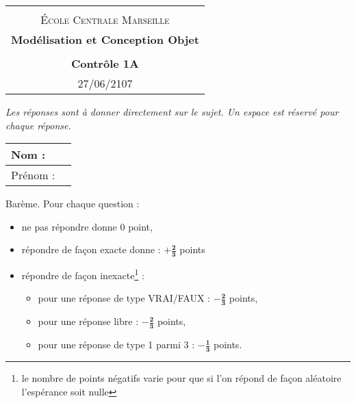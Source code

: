 \documentclass[12pt]{article}
\begin{document}
\begin{center}
  \begin{tabular}{c}
  \hline\\%
  {\textsc{\'Ecole Centrale Marseille}}\vspace{0.1cm}
  \\

    {\bf {\Large Modélisation et Conception Objet}}\\%
    \\
    {\bf  { Contrôle 1A }}\\
    {\footnotesize 27/06/2107}\\
    \hline
  \end{tabular}
\end{center}
\vspace{0.6cm}

\noindent
{\em Les réponses sont à donner directement sur le sujet. Un espace est réservé pour chaque réponse.}

\vspace*{1cm}
\noindent
\begin{tabular}{|l|p{10cm}|}
    \hline
    Nom : & \\
    \hline
    Prénom : & \\
    \hline
    
\end{tabular}


\vspace*{2cm}
\noindent
Barème. Pour chaque question : 
\begin{itemize}
    \item ne pas répondre donne 0 point,
    \item répondre de façon exacte donne : $\mathbf{+\frac{2}{3}}$ points
    \item répondre de façon inexacte\footnote{le nombre de points négatifs varie pour que si l'on répond de façon aléatoire l'espérance soit nulle} : 
    \begin{itemize}
        \item pour une réponse de type VRAI/FAUX : $\mathbf{-\frac{2}{3}}$ points,
        \item pour une réponse libre : $\mathbf{-\frac{2}{3}}$ points,
        \item pour une réponse de type 1 parmi 3 : $\mathbf{-\frac{1}{3}}$ points.
    \end{itemize}
\end{itemize}
\newpage
\end{document}

